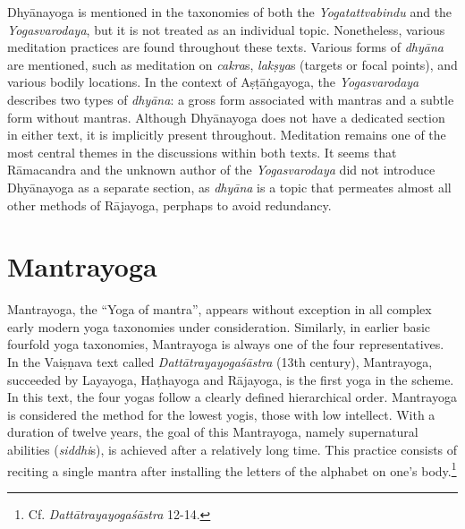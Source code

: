 Dhyānayoga is mentioned in the taxonomies of both the \textit{Yogatattvabindu} and the \textit{Yogasvarodaya}, but it is not treated as an individual topic. Nonetheless, various meditation practices are found throughout these texts. Various forms of \textit{dhyāna} are mentioned, such as meditation on \textit{cakra}s, \textit{lakṣya}s (targets or focal points), and various bodily locations. In the context of Aṣṭāṅgayoga, the \textit{Yogasvarodaya} describes two types of \textit{dhyāna}: a gross form associated with mantras and a subtle form without mantras. Although Dhyānayoga does not have a dedicated section in either text, it is implicitly present throughout. Meditation remains one of the most central themes in the discussions within both texts. It seems that Rāmacandra and the unknown author of the \emph{Yogasvarodaya} did not introduce Dhyānayoga as a separate section, as \textit{dhyāna} is a topic that permeates almost all other methods of Rājayoga, perphaps to avoid redundancy.  

\section{Mantrayoga}
\label{dhyānayogaintro}
Mantrayoga, the ``Yoga of mantra'', appears without exception in all complex early modern yoga taxonomies under consideration. Similarly, in earlier basic fourfold yoga taxonomies, Mantrayoga is always one of the four representatives. In the Vaiṣṇava text called \emph{Dattātrayayogaśāstra} (13th century), Mantrayoga, succeeded by Layayoga, Haṭhayoga and Rājayoga, is the first yoga in the scheme. In this text, the four yogas follow a clearly defined hierarchical order. Mantrayoga is considered the method for the lowest yogis, those with low intellect. With a duration of twelve years, the goal of this Mantrayoga, namely supernatural abilities (\textit{siddhi}s), is achieved after a relatively long time. This practice consists of reciting a single mantra after installing the letters of the alphabet on one's body.\footnote{Cf. \emph{Dattātrayayogaśāstra} 12-14.} 


